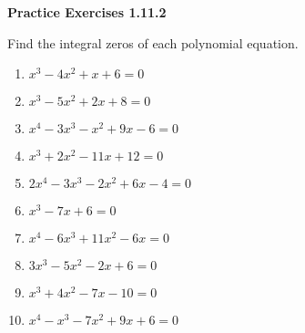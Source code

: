 \vspace{0.3ex}
\noindent\textbf{Practice Exercises 1.11.2}

\vspace{0.2ex}

Find the integral zeros of each polynomial equation.
\begin{enumerate}
    \item $x^3 - 4x^2 + x + 6 = 0$
    \item $x^3 - 5x^2 + 2x + 8 = 0$
    \item $x^4 - 3x^3 - x^2 + 9x - 6 = 0$
    \item $x^3 + 2x^2 - 11x + 12 = 0$
    \item $2x^4 - 3x^3 - 2x^2 + 6x - 4 = 0$
    \item $x^3 - 7x + 6 = 0$
    \item $x^4 - 6x^3 + 11x^2 - 6x = 0$
    \item $3x^3 - 5x^2 - 2x + 6 = 0$
    \item $x^3 + 4x^2 - 7x - 10 = 0$
    \item $x^4 - x^3 - 7x^2 + 9x + 6 = 0$
\end{enumerate}
